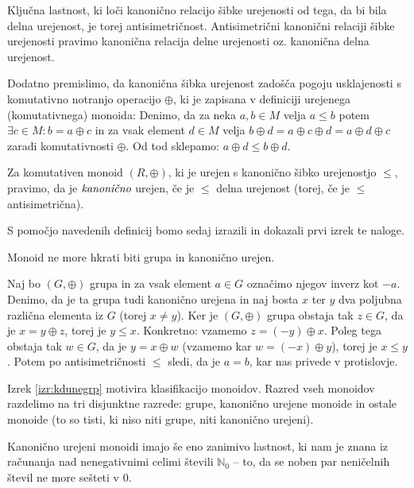 \documentclass[mat1]{fmfdelo}
\newcommand{\N}{\mathbb{N}}
\newcommand{\No}{\N_0}
\newcommand{\pojem}[1]{\ensuremath{\emph{#1}}}
\begin{document}
Ključna lastnost, ki loči kanonično relacijo šibke urejenosti od tega, da bi bila delna urejenost, je torej antisimetričnost. Antisimetrični kanonični relaciji šibke urejenosti pravimo kanonična relacija delne urejenosti oz. kanonična delna urejenost.

Dodatno premislimo, da kanonična šibka urejenost zadošča pogoju usklajenosti s komutativno notranjo operacijo $\oplus$, ki je zapisana v definiciji urejenega (komutativnega) monoida: Denimo, da za neka $a, b\in M$ velja $a \leq b$ potem $\exists c\in M: b = a \oplus c$ in za vsak element $d\in M$ velja $b \oplus d = a \oplus c \oplus d = a \oplus d \oplus c$ zaradi komutativnosti $\oplus$. Od tod sklepamo: $a \oplus d \leq b \oplus d$.
	
\begin{definicija}
		Za komutativen monoid $(R, \oplus)$, ki je urejen s kanonično šibko urejenostjo $\leq$, pravimo, da je \pojem{kanonično} urejen, če je $\leq$ delna urejenost (torej, če je $\leq$ antisimetrična).
\end{definicija}
S pomočjo navedenih definicij bomo sedaj izrazili in dokazali prvi izrek te naloge.

\begin{izrek}
	\label{izr:kdunegrp}
	Monoid ne more hkrati biti grupa in kanonično urejen.
\end{izrek}
\begin{dokaz}
	Naj bo $(G, \oplus)$ grupa in za vsak element $a\in G$ označimo njegov inverz kot $-a$. Denimo, da je ta grupa tudi kanonično urejena in naj bosta $x$ ter $y$ dva poljubna različna elementa iz $G$ (torej $x\neq y$).
	Ker je $(G, \oplus)$ grupa obstaja tak $z\in G$, da je $x = y \oplus z$, torej je $y \leq x$. Konkretno: vzamemo $z = (-y)\oplus x$. Poleg tega obstaja tak $w\in G$, da je $y = x \oplus w$ (vzamemo kar $w = (-x)\oplus y$), torej je $x \leq y$. Potem po antisimetričnosti $\leq$ sledi, da je $a = b$, kar nas privede v protislovje.
\end{dokaz}

\begin{opomba}
	Izrek \ref{izr:kdunegrp} motivira klasifikacijo monoidov. Razred vseh monoidov razdelimo na tri disjunktne razrede: grupe, kanonično urejene monoide in ostale monoide (to so tisti, ki niso niti grupe, niti kanonično urejeni).
\end{opomba}

Kanonično urejeni monoidi imajo še eno zanimivo lastnost, ki nam je znana iz računanja nad nenegativnimi celimi števili $\No$ -- to, da se noben par neničelnih števil ne more sešteti v $0$.
\end{document}
